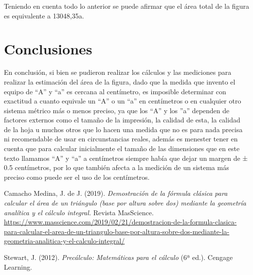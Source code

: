 \documentclass[12pt]{article}
\begin{document}
Teniendo en cuenta todo lo anterior se puede afirmar que el área total de la figura es equivalente a 13048,35a. 

\section*{Conclusiones}
En conclusión, si bien se pudieron realizar los cálculos y las mediciones para realizar la estimación del área de la figura, dado que la medida que invento el equipo de “A” y “a” es cercana al centímetro, es imposible determinar con exactitud a cuanto equivale un “A” o un “a” en centímetros o en cualquier otro sistema métrico más o menos preciso, ya que los “A” y los ”a” dependen de factores externos como el tamaño de la impresión, la calidad de esta, la calidad de la hoja u muchos otros que lo hacen una medida que no es para nada precisa ni recomendable de usar en circunstancias reales, además es menester tener en cuenta que para calcular inicialmente el tamaño de las dimensiones que en este texto llamamos “A” y “a” a centímetros siempre había que dejar un margen de ± 0.5 centímetros, por lo que también afecta a la medición de un sistema más preciso como puede ser el uso de los centímetros. 
\begin{thebibliography}{9}
Camacho Medina, J. de J. (2019). \textit{Demostración de la fórmula clásica para calcular el área de un triángulo (base por altura sobre dos) mediante la geometría analítica y el cálculo integral.} Revista MasScience. \url{https://www.masscience.com/2019/02/21/demostracion-de-la-formula-clasica-para-calcular-el-area-de-un-triangulo-base-por-altura-sobre-dos-mediante-la-geometria-analitica-y-el-calculo-integral/}

Stewart, J. (2012). \textit{Precálculo: Matemáticas para el cálculo} (6ª ed.). Cengage Learning.
\end{thebibliography}
\end{document}
